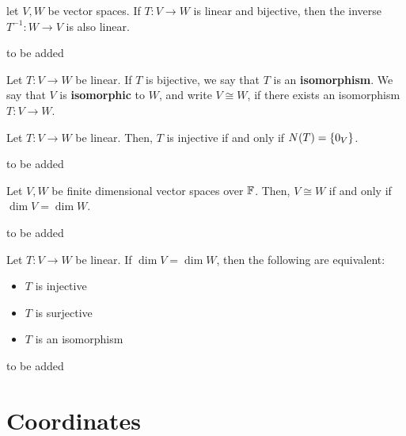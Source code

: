 \documentclass{article}
\begin{document}
\begin{thm}
let $ V, W $ be vector spaces. If $ T: V \rightarrow W $ is linear and bijective, then the inverse $ T^{-1}: W \rightarrow V $ is also linear.
\end{thm}

\begin{pf}[source=Primary Source Material]
to be added
\end{pf}

\begin{defn}
Let $ T: V \rightarrow W $ be linear. If $ T $ is bijective, we say that $ T $ is an \textbf{isomorphism}. \vsp
We say that $ V $ is \textbf{isomorphic} to $ W $, and write $ V \cong W $, if there exists an isomorphism $ T: V \rightarrow W $.
\end{defn}

\begin{thm}
Let $ T: V \rightarrow W $ be linear. Then, $ T $ is injective if and only if $ N(T) = \left\{{0_{V}}\right\} $.
\end{thm}

\begin{pf}
to be added
\end{pf}

\begin{thm}
Let $ V, W $ be finite dimensional vector spaces over $ \mathbb{F} $. Then, $ V \cong W $ if and only if $ \dim V = \dim W $.
\end{thm}

\begin{pf}[source=Primary Source Material]
to be added
\end{pf}

\begin{thm}
Let $ T: V \rightarrow W $ be linear. If $ \dim V = \dim W $, then the following are equivalent:
\begin{itemize}
    \item $ T $ is injective
    \item $ T $ is surjective
    \item $ T $ is an isomorphism
\end{itemize}
\end{thm}

\begin{pf}
to be added
\end{pf}

\newpage
\section{Coordinates}
\end{document}
